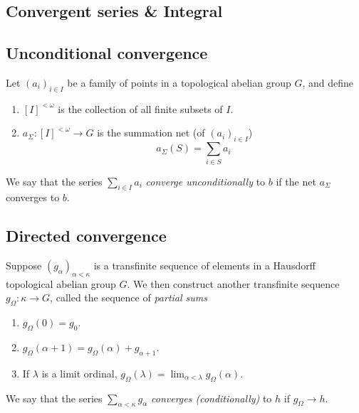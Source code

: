\documentclass{treatise}
\begin{document}
\begin{shaded}
\section{Convergent series \& Integral}
\subsection{Unconditional convergence}
Let $(a_i)_{i \in I}$ be a family of points in a topological abelian group $G$, and define
\begin{enumerate}
	\item $[I]^{< \omega}$ is the collection of all finite subsets of $I$.
	\item $a_\Sigma: [I]^{< \omega} \to G$ is the summation net (of $(a_i)_{i \in I}$)
	$$a_\Sigma (S) = \sum_{i \in S} a_i$$
\end{enumerate}
We say that the series $\sum_{i \in I} a_i$ \emph{converge unconditionally} to $b$ if the net $a_\Sigma$ converges to $b$.

\subsection{Directed convergence}
Suppose $(g_\alpha)_{\alpha < \kappa}$ is a transfinite sequence of elements in a Hausdorff topological abelian group $G$. We then construct another transfinite sequence $g_\Omega : \kappa \to G$, called the sequence of \emph{partial sums}
\begin{enumerate}
	\item $g_\Omega (0) = g_0$.
	\item $g_\Omega (\alpha + 1) = g_\Omega (\alpha) + g_{\alpha + 1}$.
	\item If $\lambda$ is a limit ordinal, $g_\Omega (\lambda) = \lim_{\alpha < \lambda} g_\Omega (\alpha)$.
\end{enumerate}
We say that the series $\sum_{\alpha < \kappa} g_\alpha$ \emph{converges (conditionally)} to $h$ if $g_\Omega \to h$.

\newpage
\newpage


\end{shaded}
\end{document}
